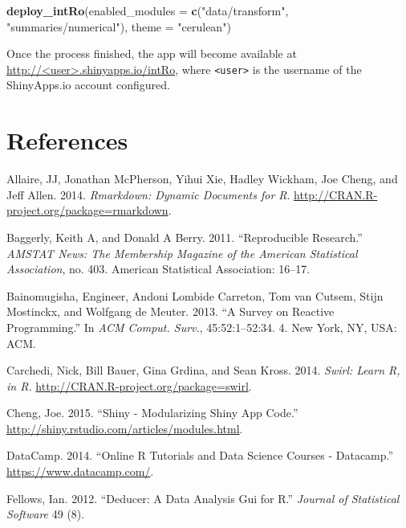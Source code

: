 \documentclass[12pt,]{article}
\newenvironment{Shaded}{\begin{snugshade}}{\end{snugshade}}
\newcommand{\KeywordTok}[1]{\textcolor[rgb]{0.13,0.29,0.53}{\textbf{{#1}}}}
\newcommand{\DataTypeTok}[1]{\textcolor[rgb]{0.13,0.29,0.53}{{#1}}}
\newcommand{\StringTok}[1]{\textcolor[rgb]{0.31,0.60,0.02}{{#1}}}
\newcommand{\NormalTok}[1]{{#1}}
\begin{document}
\begin{Shaded}
\begin{Highlighting}[]
\KeywordTok{deploy_intRo}\NormalTok{(}\DataTypeTok{enabled_modules =} \KeywordTok{c}\NormalTok{(}\StringTok{"data/transform"}\NormalTok{, }\StringTok{"summaries/numerical"}\NormalTok{), }
             \DataTypeTok{theme =} \StringTok{"cerulean"}\NormalTok{)}
\end{Highlighting}
\end{Shaded}

Once the process finished, the app will become available at
\url{http://<user>.shinyapps.io/intRo}, where
\texttt{\textless{}user\textgreater{}} is the username of the
ShinyApps.io account configured.

\section*{References}\label{references}

\hypertarget{refs}{}
\hypertarget{ref-rmarkdown}{}
Allaire, JJ, Jonathan McPherson, Yihui Xie, Hadley Wickham, Joe Cheng,
and Jeff Allen. 2014. \emph{Rmarkdown: Dynamic Documents for R}.
\url{http://CRAN.R-project.org/package=rmarkdown}.

\hypertarget{ref-baggerly2011reproducible}{}
Baggerly, Keith A, and Donald A Berry. 2011. ``Reproducible Research.''
\emph{AMSTAT News: The Membership Magazine of the American Statistical
Association}, no. 403. American Statistical Association: 16--17.

\hypertarget{ref-bainomugisha2012survey}{}
Bainomugisha, Engineer, Andoni Lombide Carreton, Tom van Cutsem, Stijn
Mostinckx, and Wolfgang de Meuter. 2013. ``A Survey on Reactive
Programming.'' In \emph{ACM Comput. Surv.}, 45:52:1--52:34. 4. New York,
NY, USA: ACM.

\hypertarget{ref-swirl}{}
Carchedi, Nick, Bill Bauer, Gina Grdina, and Sean Kross. 2014.
\emph{Swirl: Learn R, in R.}
\url{http://CRAN.R-project.org/package=swirl}.

\hypertarget{ref-shinymodules}{}
Cheng, Joe. 2015. ``Shiny - Modularizing Shiny App Code.''
\url{http://shiny.rstudio.com/articles/modules.html}.

\hypertarget{ref-datacamp}{}
DataCamp. 2014. ``Online R Tutorials and Data Science Courses -
Datacamp.'' \url{https://www.datacamp.com/}.

\hypertarget{ref-fellows2012}{}
Fellows, Ian. 2012. ``Deducer: A Data Analysis Gui for R.''
\emph{Journal of Statistical Software} 49 (8).
\end{document}
